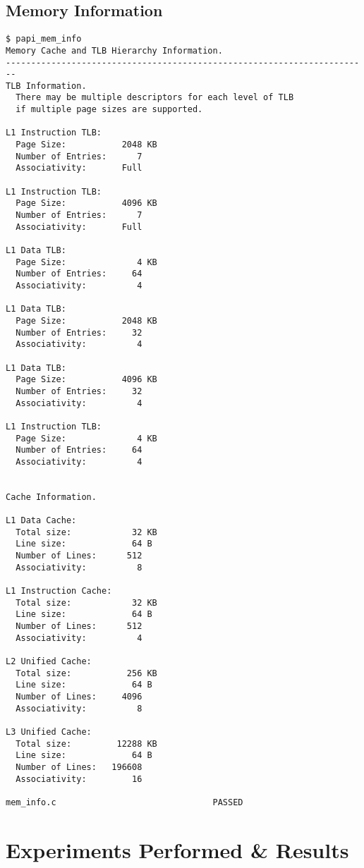 \documentclass{article}
\begin{document}
\subsection{Memory Information}
\begin{lstlisting}
$ papi_mem_info
Memory Cache and TLB Hierarchy Information.
------------------------------------------------------------------------
TLB Information.
  There may be multiple descriptors for each level of TLB
  if multiple page sizes are supported.

L1 Instruction TLB:
  Page Size:           2048 KB
  Number of Entries:      7
  Associativity:       Full

L1 Instruction TLB:
  Page Size:           4096 KB
  Number of Entries:      7
  Associativity:       Full

L1 Data TLB:
  Page Size:              4 KB
  Number of Entries:     64
  Associativity:          4

L1 Data TLB:
  Page Size:           2048 KB
  Number of Entries:     32
  Associativity:          4

L1 Data TLB:
  Page Size:           4096 KB
  Number of Entries:     32
  Associativity:          4

L1 Instruction TLB:
  Page Size:              4 KB
  Number of Entries:     64
  Associativity:          4


Cache Information.

L1 Data Cache:
  Total size:            32 KB
  Line size:             64 B
  Number of Lines:      512
  Associativity:          8

L1 Instruction Cache:
  Total size:            32 KB
  Line size:             64 B
  Number of Lines:      512
  Associativity:          4

L2 Unified Cache:
  Total size:           256 KB
  Line size:             64 B
  Number of Lines:     4096
  Associativity:          8

L3 Unified Cache:
  Total size:         12288 KB
  Line size:             64 B
  Number of Lines:   196608
  Associativity:         16

mem_info.c                               PASSED
\end{lstlisting}

\section{Experiments Performed \& Results}
\end{document}
